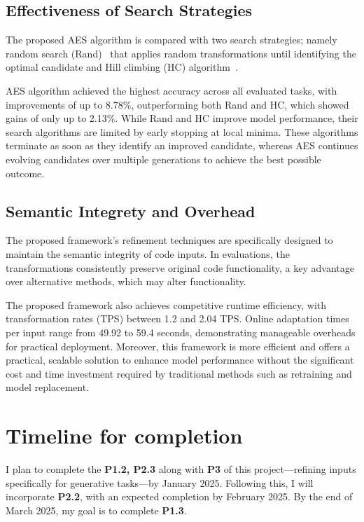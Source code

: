\subsection{Effectiveness of Search Strategies}
The proposed AES algorithm is compared with  two search strategies; namely random search (Rand)~\cite{zabinsky2009random} that applies random transformations until identifying the optimal candidate and Hill climbing (HC) algorithm~\cite{selman2006hill}. 

AES algorithm achieved the highest accuracy across all evaluated tasks, with improvements of up to 8.78\%, outperforming both Rand and HC, which showed gains of only up to 2.13\%. While Rand and HC improve model performance, their search algorithms are limited by early stopping at local minima. These algorithms terminate as soon as they identify an improved candidate, whereas AES continues evolving candidates over multiple generations to achieve the best possible outcome. 

\subsection{Semantic Integrety and Overhead}
The proposed framework’s refinement techniques are specifically designed to maintain the semantic integrity of code inputs. In evaluations, the transformations consistently preserve original code functionality, a key advantage over alternative methods, which may alter functionality. 

The proposed framework also achieves competitive runtime efficiency, with transformation rates (TPS) between 1.2 and 2.04 TPS. Online adaptation times per input range from 49.92 to 59.4 seconds, demonstrating manageable overheads for practical deployment. Moreover, this framework is more efficient and offers a practical, scalable solution to enhance model performance without the significant cost and time investment required by traditional methods such as retraining and model replacement.


\section{Timeline for completion}
I plan to complete the \textbf{P1.2, P2.3} along with \textbf{P3} of this project—refining inputs specifically for generative tasks—by January 2025. Following this, I will incorporate \textbf{P2.2}, with an expected completion by February 2025. By the end of March 2025, my goal is to complete \textbf{P1.3}.

